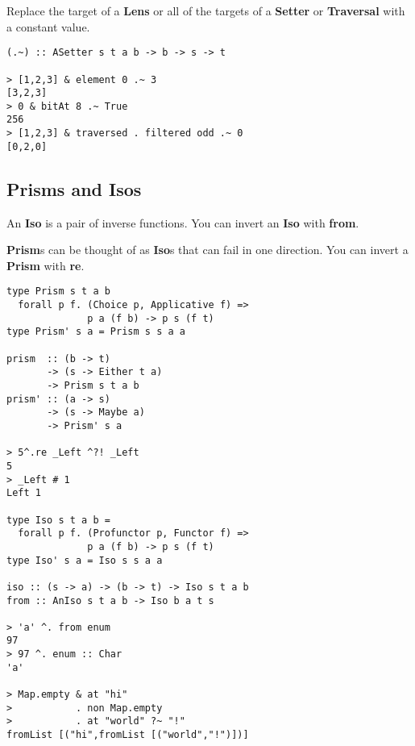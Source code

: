 \begin{multicols}{2}
\begin{box1}
Replace the target of a \textbf{Lens} or all of the targets of a
\textbf{Setter} or \textbf{Traversal} with a constant value.

\begin{verbatim}
(.~) :: ASetter s t a b -> b -> s -> t

> [1,2,3] & element 0 .~ 3
[3,2,3]
> 0 & bitAt 8 .~ True
256
> [1,2,3] & traversed . filtered odd .~ 0
[0,2,0]
\end{verbatim}
\end{box1}

\begin{box2}
\subsection *{Prisms and Isos}

An \textbf{Iso} is a pair of inverse functions. You can invert an \textbf{Iso} with \textbf{from}.

\textbf{Prism}s can be thought of as \textbf{Iso}s that can fail in one
direction. You can invert a \textbf{Prism} with \textbf{re}.

\begin{verbatim}
type Prism s t a b 
  forall p f. (Choice p, Applicative f) =>
              p a (f b) -> p s (f t)
type Prism' s a = Prism s s a a

prism  :: (b -> t)
       -> (s -> Either t a)
       -> Prism s t a b
prism' :: (a -> s)
       -> (s -> Maybe a)
       -> Prism' s a

> 5^.re _Left ^?! _Left
5
> _Left # 1
Left 1

type Iso s t a b =
  forall p f. (Profunctor p, Functor f) =>
              p a (f b) -> p s (f t)
type Iso' s a = Iso s s a a

iso :: (s -> a) -> (b -> t) -> Iso s t a b
from :: AnIso s t a b -> Iso b a t s

> 'a' ^. from enum
97
> 97 ^. enum :: Char
'a'

> Map.empty & at "hi"
>           . non Map.empty
>           . at "world" ?~ "!"
fromList [("hi",fromList [("world","!")])]
\end{verbatim}

\end{box2}

\end{multicols}

